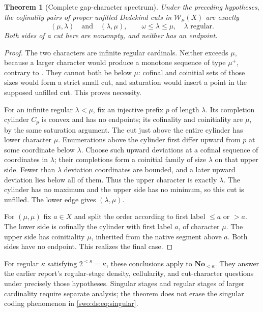 \documentclass[11pt]{article}
\newtheorem{theorem}{Theorem}[section]
\theoremstyle{definition}
\theoremstyle{remark}
\newcommand{\No}{\mathbf{No}}
\newcommand{\WO}{\mathcal W}
\begin{document}
\begin{theorem}[Complete gap-character spectrum]\label{swo:ds:thm:gap-spectrum}
Under the preceding hypotheses, the cofinality pairs of proper unfilled
Dedekind cuts in $\WO_\mu(X)$ are exactly
\[
 (\mu,\lambda)\quad\text{and}\quad(\lambda,\mu),
 \qquad \omega\le\lambda\le\mu,\quad\lambda\text{ regular}.
\tag{S16.4}\label{swo:ds:eq:gap-spectrum}
\]
Both sides of a cut here are nonempty, and neither has an endpoint.
\end{theorem}
\begin{proof}
The two characters are infinite regular cardinals. Neither exceeds
$\mu$, because a larger character would produce a monotone sequence
of type $\mu^+$, contrary to . They cannot
both be below $\mu$: cofinal and coinitial sets of those sizes would
form a strict small cut, and saturation would insert a point in the
supposed unfilled cut. This proves necessity.

For an infinite regular $\lambda<\mu$, fix an injective prefix $p$ of
length $\lambda$. Its completion cylinder $C_p$ is convex and has no
endpoints; its cofinality and coinitiality are $\mu$, by the same
saturation argument. The cut just above the entire cylinder has lower
character $\mu$. Enumerations above the cylinder first differ upward
from $p$ at some coordinate below $\lambda$. Choose such upward
deviations at a cofinal sequence of coordinates in $\lambda$; their
completions form a coinitial family of size $\lambda$ on that upper
side. Fewer than $\lambda$ deviation coordinates are bounded, and a
later upward deviation lies below all of them. Thus the upper character
is exactly $\lambda$. The cylinder has no maximum and the upper side
has no minimum, so this cut is unfilled. The lower edge gives
$(\lambda,\mu)$.

For $(\mu,\mu)$ fix $a\in X$ and split the order according to
first label $\le a$ or $>a$. The lower side is cofinally the cylinder
with first label $a$, of character $\mu$. The upper side has
coinitiality $\mu$, inherited from the native segment above $a$.
Both sides have no endpoint. This realizes the final case.
\end{proof}

For regular $\kappa$ satisfying $2^{<\kappa}=\kappa$, these conclusions
apply to $\No_{<\kappa}$. They answer the earlier report's regular-stage
density, cellularity, and cut-character questions under precisely those
hypotheses. Singular stages and regular stages of larger cardinality
require separate analysis; the theorem does not erase the singular
coding phenomenon in \eqref{swo:ds:eq:singular}.
\end{document}
